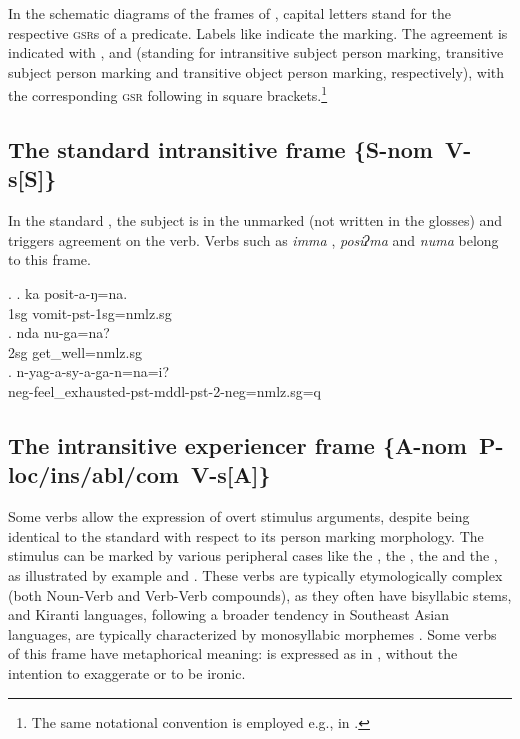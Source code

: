 In the schematic diagrams of the frames of ,  capital letters stand for the respective \textsc{gsr}s of a predicate. Labels like  indicate the  marking. The agreement is indicated with ,  and  (standing for intransitive subject person marking, transitive subject person marking and transitive object person marking, respectively), with the corresponding \textsc{gsr} following in square brackets.\footnote{The same notational convention is employed  e.g., in \citet{Schikowski2014_Flexible}.} 
 

\subsection[The standard intransitive frame]{The standard intransitive frame %
\mbox{{\bf \{S-{\sc nom} V-s[S]\}}}}
\label{stand-itr}

\largerpage
\noindent 
In the standard , the subject is in the unmarked   (not written in the glosses) and triggers agreement on the verb. Verbs such as \emph{imma} ,  \emph{posiʔma}  and \emph{numa}  belong to this frame.

\ex. \ag. ka posit-a-ŋ=na.\\
		 {\sc 1sg} vomit-{\sc pst-1sg=nmlz.sg}	\\
 	\bg. nda nu-ga=na?\\
	{\sc 2sg}  get\_well{=nmlz.sg}	\\
	\bg. n-yag-a-sy-a-ga-n=na=i?\\ 
{\sc neg}-feel\_exhausted{\sc -pst-mddl-pst-2-neg=nmlz.sg=q}\\

\subsection[The intransitive experiencer frame]{The intransitive experiencer frame 	 %
\mbox{\{A-{\sc nom} P-{\sc loc/ins/abl/com} V-s[A]\}}}
\label{itr-exp}


\noindent 
Some  verbs allow the expression of overt stimulus arguments, despite being identical to  the standard  with respect to its person marking morphology. The stimulus can be marked by various peripheral cases like the , the , the  and the , as illustrated by example \Next[a] and \Next[b].  These  verbs are typically etymologically complex (both Noun-Verb and Verb-Verb compounds), as they often have bisyllabic stems, and Kiranti languages, following a broader tendency in Southeast Asian languages, are typically characterized by monosyllabic morphemes \citep{Matisoff1990_Bulging}. Some verbs of this frame have metaphorical meaning:  is expressed as in \Next[c], without the intention to exaggerate or to be ironic. 

